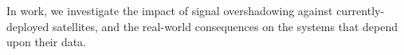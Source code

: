 In work, we investigate the impact of signal overshadowing against currently-deployed satellites, and the real-world consequences on the systems that depend upon their data.








